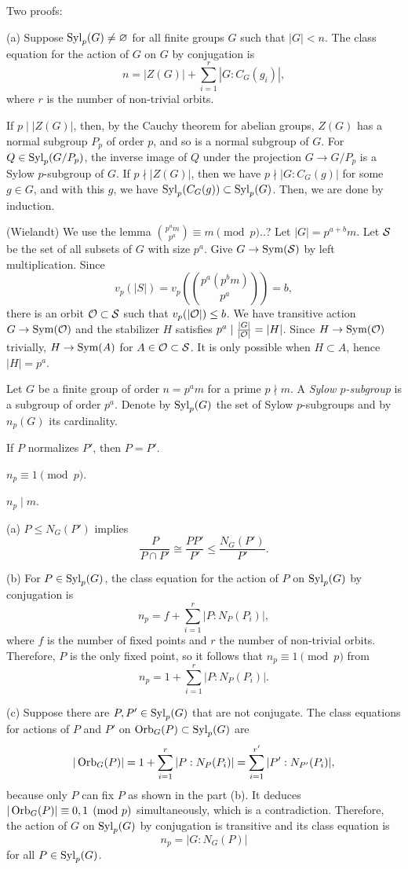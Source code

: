 \documentclass{../../large}
\begin{document}
\begin{prb}
Two proofs:
\end{prb}
\begin{pf}
(a)
Suppose $\operatorname{Syl}_p(G)\ne\varnothing$ for all finite groups $G$ such that $|G|<n$.
The class equation for the action of $G$ on $G$ by conjugation is
\[n=|Z(G)|+\sum_{i=1}^r|G:C_G(g_i)|,\]
where $r$ is the number of non-trivial orbits.

If $p\mid|Z(G)|$, then, by the Cauchy theorem for abelian groups, $Z(G)$ has a normal subgroup $P_p$ of order $p$, and so is a normal subgroup of $G$.
For $Q\in\operatorname{Syl}_p(G/P_p)$, the inverse image of $Q$ under the projection $G\to G/P_p$ is a Sylow $p$-subgroup of $G$.
If $p\nmid|Z(G)|$, then we have $p\nmid|G:C_G(g)|$ for some $g\in G$, and with this $g$, we have $\operatorname{Syl}_p(C_G(g))\subset\operatorname{Syl}_p(G)$.
Then, we are done by induction.

(Wielandt)
We use the lemma $\binom{p^am}{p^a}\equiv m\pmod p$..?
Let $|G|=p^{a+b}m$.
Let $\mathcal{S}$ be the set of all subsets of $G$ with size $p^a$.
Give $G\to\operatorname{Sym}(\mathcal{S})$ by left multiplication.
Since
\[v_p(|S|)=v_p(\binom{p^a(p^bm)}{p^a})=b,\]
there is an orbit $\mathcal{O}\subset\mathcal{S}$ such that $v_p(|\mathcal{O}|)\le b$.
We have transitive action $G\to\operatorname{Sym}(\mathcal{O})$ and the stabilizer $H$ satisfies $p^a\mid\frac{|G|}{|\mathcal{O}|}=|H|$.
Since $H\to\operatorname{Sym}(\mathcal{O})$ trivially, $H\to\operatorname{Sym}(A)$ for $A\in\mathcal{O}\subset\mathcal{S}$.
It is only possible when $H\subset A$, hence $|H|=p^a$.
\end{pf}


\begin{prb}
Let $G$ be a finite group of order $n=p^am$ for a prime $p\nmid m$.
A \emph{Sylow $p$-subgroup} is a subgroup of order $p^a$.
Denote by $\operatorname{Syl}_p(G)$ the set of Sylow $p$-subgroups and by $n_p(G)$ its cardinality.
\begin{parts}
\item If $P$ normalizes $P'$, then $P=P'$.
\item $n_p\equiv1\pmod p$.
\item $n_p\mid m$.
\end{parts}
\end{prb}
\begin{pf}
(a)
$P\le N_G(P')$ implies
\[\frac P{P\cap P'}\cong\frac{PP'}{P'}\le\frac{N_G(P')}{P'}.\]


(b)
For $P\in\operatorname{Syl}_p(G)$, the class equation for the action of $P$ on $\operatorname{Syl}_p(G)$ by conjugation is
\[n_p=f+\sum_{i=1}^r|P:N_P(P_i)|,\]
where $f$ is the number of fixed points and $r$ the number of non-trivial orbits.
Therefore, $P$ is the only fixed point, so it follows that $n_p\equiv1\pmod p$ from
\[n_p=1+\sum_{i=1}^r|P:N_P(P_i)|.\]

(c)
Suppose there are $P,P'\in\operatorname{Syl}_p(G)$ that are not conjugate.
The class equations for actions of $P$ and $P'$ on $\operatorname{Orb}_G(P)\subset\operatorname{Syl}_p(G)$ are
\[|\operatorname{Orb}_G(P)|=1+\sum_{i=1}^r|P:N_P(P_i)|=\sum_{i=1}^{r'}|P':N_{P'}(P_i)|,\]
because only $P$ can fix $P$ as shown in the part (b).
It deduces $|\operatorname{Orb}_G(P)|\equiv0,1\pmod{p}$ simultaneously, which is a contradiction.
Therefore, the action of $G$ on $\operatorname{Syl}_p(G)$ by conjugation is transitive and its class equation is
\[n_p=|G:N_G(P)|\]
for all $P\in\operatorname{Syl}_p(G)$.
\end{pf}
\end{document}
